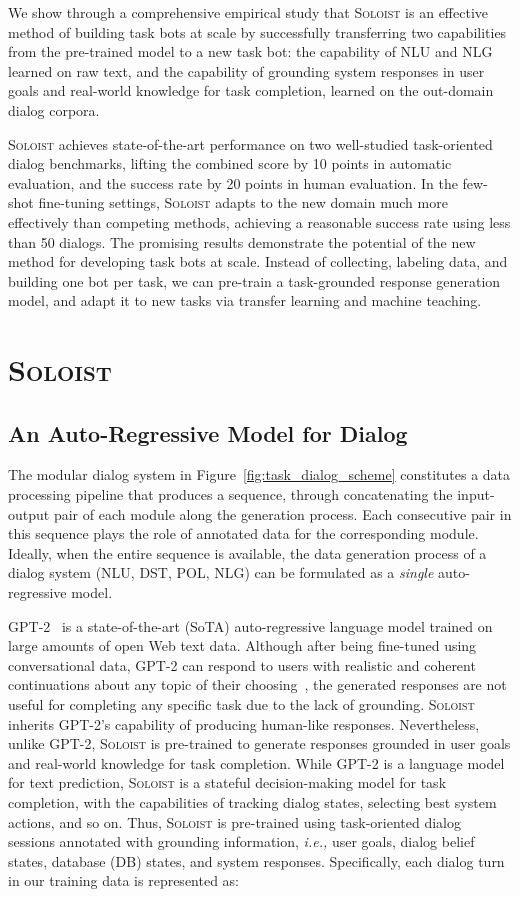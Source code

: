 \documentclass[11pt,a4paper]{article}
\newcommand{\ie}[0]{\emph{i.e., }}
\newcommand{\model}{\textsc{Soloist}}
\begin{document}
We show through a comprehensive empirical study that \model{} is an effective method of building task bots at scale by successfully transferring two capabilities from the pre-trained model to a new task bot: 
 the capability of NLU and NLG
learned on raw text, and 
 the capability of grounding system responses in user goals and real-world knowledge for task completion, learned on the out-domain dialog corpora.

\model{} achieves state-of-the-art performance on two well-studied task-oriented dialog benchmarks, lifting the combined score by 10 points in automatic evaluation, and the success rate by 20 points in human evaluation.
In the few-shot fine-tuning settings, \model{} adapts to the new domain much more effectively than competing methods, achieving a reasonable success rate using less than 50 dialogs.
The promising results demonstrate the potential of the new method for developing task bots at scale.
Instead of collecting, labeling data, and building one bot per task, we can pre-train a task-grounded response generation model, and adapt it to new tasks via transfer learning and machine teaching.

\section{\model{}}

\subsection{An Auto-Regressive Model for Dialog}
The modular dialog system in Figure~\ref{fig:task_dialog_scheme} constitutes a data processing pipeline that produces a sequence, through concatenating the input-output pair of each module along the generation process. Each consecutive pair in this sequence plays the role of annotated data for the corresponding module. Ideally, when the entire sequence is available, the data generation process of a dialog system (NLU, DST, POL, NLG) can be formulated as a {\em single} auto-regressive model.

GPT-2~\cite{gpt2} is a state-of-the-art (SoTA) auto-regressive language model
trained on large amounts of open Web text data.
Although after being fine-tuned using conversational data, GPT-2 can respond to users with realistic and coherent continuations about any topic of their choosing~\cite{zhang2019dialogpt}, the generated responses are not useful for completing any specific task due to the lack of grounding.
\model{} inherits GPT-2's capability of producing human-like responses. Nevertheless, unlike GPT-2, \model{} is pre-trained to generate responses grounded in user goals and real-world knowledge for task completion. While GPT-2 is a language model for text prediction, \model{} is a stateful decision-making model for task completion, with the capabilities of tracking dialog states, selecting best system actions, and so on. 
Thus, \model{} is pre-trained using task-oriented dialog sessions annotated with grounding information, \ie user goals, dialog belief states, database (DB) states, and system responses. 
Specifically, each dialog turn in our training data is represented as:
\end{document}
